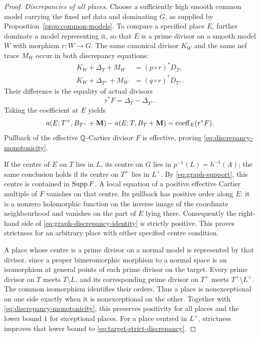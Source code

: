 \begin{proof}
\emph{Discrepancies of all places.}
Choose a sufficiently high smooth common model carrying the fixed
nef data and dominating $G$, as supplied by
Proposition~\ref{prop:common-models}.  To compare a specified place
$E$, further dominate a model representing it, so that $E$ is a prime
divisor on a smooth model $W$ with morphism $r:W\to G$.  The same
canonical divisor $K_W$ and the same nef trace $M_W$ occur in both
discrepancy equations:
\[
 \begin{aligned}
 K_W+\Delta_T+M_W&=(p\circ r)^*D_T,\\
 K_W+\Delta_{T^+}+M_W&=(q\circ r)^*D_{T^+}.
 \end{aligned}
\]
Their difference is the equality of actual divisors
\[
 r^*F=\Delta_T-\Delta_{T^+}.
\]
Taking the coefficient at $E$ yields
\begin{equation}\label{eq:graph-discrepancy-identity}
 a(E;T^+,B_{T^+}+\mathbf M)-a(E;T,B_T+\mathbf M)
   =\operatorname{coeff}_E(r^*F).
\end{equation}
Pullback of the effective $\mathbb Q$-Cartier divisor $F$ is effective, proving
\eqref{eq:discrepancy-monotonicity}.

If the centre of $E$ on $T$ lies in $L$, its centre on $G$ lies in
$p^{-1}(L)=h^{-1}(A)$; the same conclusion holds if its centre on
$T^+$ lies in $L^+$.  By \eqref{eq:graph-support}, this centre is
contained in $\operatorname{Supp} F$.  A local equation of a positive effective
Cartier multiple of $F$ vanishes on that centre.  Its pullback has
positive order along $E$: it is a nonzero holomorphic function on
the inverse image of the coordinate neighbourhood and vanishes on
the part of $E$ lying there.  Consequently the
right-hand side of \eqref{eq:graph-discrepancy-identity} is strictly
positive.  This proves strictness for an arbitrary place with either
specified centre condition.

A place whose centre is a prime divisor on a normal model is
represented by that divisor, since a proper bimeromorphic morphism
to a normal space is an isomorphism at general points of each prime
divisor on the target.  Every prime divisor
on $T$ meets $T\setminus L$, and its corresponding prime divisor on
$T^+$ meets $T^+\setminus L^+$.  The common isomorphism identifies
their orders. Thus a place is nonexceptional on one side exactly
when it is nonexceptional on the other. Together with
\eqref{eq:discrepancy-monotonicity}, this preserves positivity for
all places and the lower bound $1$ for exceptional places. For a
place centred in $L^+$, strictness improves that lower bound to
\eqref{eq:target-strict-discrepancy}.


\end{proof}
